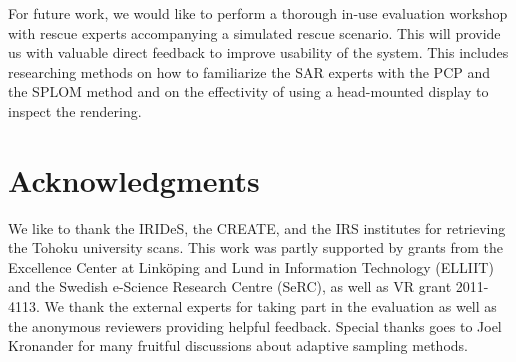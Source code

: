 \documentclass{egpubl}
\begin{document}
For future work, we would like to perform a thorough in-use evaluation workshop with rescue experts accompanying a simulated rescue scenario. This will provide us with valuable direct feedback to improve usability of the system. This includes researching methods on how to familiarize the SAR experts with the PCP and the SPLOM method and on the effectivity of using a head-mounted display to inspect the rendering.



\section*{Acknowledgments}
We like to thank the IRIDeS, the CREATE, and the IRS institutes for retrieving the Tohoku university scans. This work was partly supported by grants from the Excellence Center at Link\"oping and Lund in Information Technology (ELLIIT) and the Swedish e-Science Research Centre (SeRC), as well as VR grant 2011-4113. We thank the external experts for taking part in the evaluation as well as the anonymous reviewers providing helpful feedback. Special thanks goes to Joel Kronander for many fruitful discussions about adaptive sampling methods.

%


\end{document}
